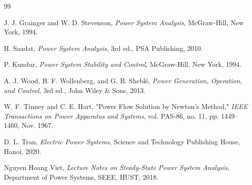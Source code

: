 \documentclass[12pt,a4paper,oneside]{report}
\begin{document}
\begin{thebibliography}{99}

J. J. Grainger and W. D. Stevenson, \textit{Power System Analysis}, McGraw-Hill, New York, 1994.

H. Saadat, \textit{Power System Analysis}, 3rd ed., PSA Publishing, 2010.

P. Kundur, \textit{Power System Stability and Control}, McGraw-Hill, New York, 1994.

A. J. Wood, B. F. Wollenberg, and G. B. Sheblé, \textit{Power Generation, Operation, and Control}, 3rd ed., John Wiley \& Sons, 2013.

W. F. Tinney and C. E. Hart, "Power Flow Solution by Newton's Method," \textit{IEEE Transactions on Power Apparatus and Systems}, vol. PAS-86, no. 11, pp. 1449--1460, Nov. 1967.

D. L. Tran, \textit{Electric Power Systems}, Science and Technology Publishing House, Hanoi, 2020.

Nguyen Hoang Viet, \textit{Lecture Notes on Steady-State Power System Analysis}, Department of Power Systems, SEEE, HUST, 2018.

\end{thebibliography}
\end{document}
